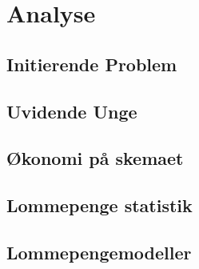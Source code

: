 





\chapter{Analyse}

\section{Initierende Problem}


\section{Uvidende Unge}
\label{UvidendeUnge}


\section{Økonomi på skemaet}


\section{Lommepenge statistik}


\section{Lommepengemodeller}




%





